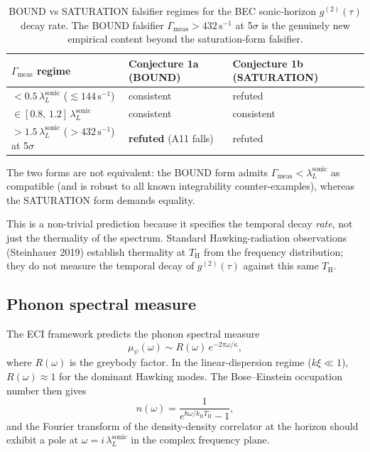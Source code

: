 \documentclass[12pt,a4paper]{article}
\renewcommand{\TH}{T_{\mathrm{H}}}
\newcommand{\lambdaL}{\lambda_L^{\mathrm{sonic}}}
\newcommand{\kB}{k_{\mathrm{B}}}
\begin{document}
\begin{table}[h]
\centering
\begin{tabular}{lll}
\toprule
$\Gamma_{\mathrm{meas}}$ regime & Conjecture 1a (BOUND) & Conjecture 1b (SATURATION) \\
\midrule
$< 0.5\,\lambdaL$ ($\lesssim 144\,\mathrm{s}^{-1}$) & consistent & refuted \\
$\in [0.8,\,1.2]\,\lambdaL$ & consistent & consistent \\
$> 1.5\,\lambdaL$ ($> 432\,\mathrm{s}^{-1}$) at 5$\sigma$
  & \textbf{refuted} (A11 falls)
  & refuted \\
\bottomrule
\end{tabular}
\caption{BOUND vs SATURATION falsifier regimes for the BEC sonic-horizon
$g^{(2)}(\tau)$ decay rate.  The BOUND falsifier
$\Gamma_{\mathrm{meas}} > 432\,\mathrm{s}^{-1}$ at 5$\sigma$ is the
genuinely new empirical content beyond the saturation-form falsifier.}
\label{tab:bound-vs-sat}
\end{table}

\noindent The two forms are not equivalent: the BOUND form admits
$\Gamma_{\mathrm{meas}} < \lambdaL$ as compatible (and is robust to all
known integrability counter-examples), whereas the SATURATION form
demands equality.

\medskip
This is a non-trivial prediction because it specifies the temporal decay
\emph{rate}, not just the thermality of the spectrum.
Standard Hawking-radiation observations (Steinhauer 2019) establish thermality
at $\TH$ from the frequency distribution; they do not measure the temporal
decay of $g^{(2)}(\tau)$ against this same $\TH$.

\subsection{Phonon spectral measure}

The ECI framework predicts the phonon spectral measure
\begin{equation}
  \mu_\psi(\omega) \sim R(\omega)\,e^{-2\pi\omega/\kappa},
\end{equation}
where $R(\omega)$ is the greybody factor.
In the linear-dispersion regime ($k\xi \ll 1$), $R(\omega) \approx 1$ for
the dominant Hawking modes.
The Bose--Einstein occupation number then gives
\begin{equation}
  n(\omega) = \frac{1}{e^{\hbar\omega/\kB\TH} - 1},
\end{equation}
and the Fourier transform of the density-density correlator at the horizon
should exhibit a pole at $\omega = i\,\lambdaL$ in the complex frequency
plane.
\end{document}
